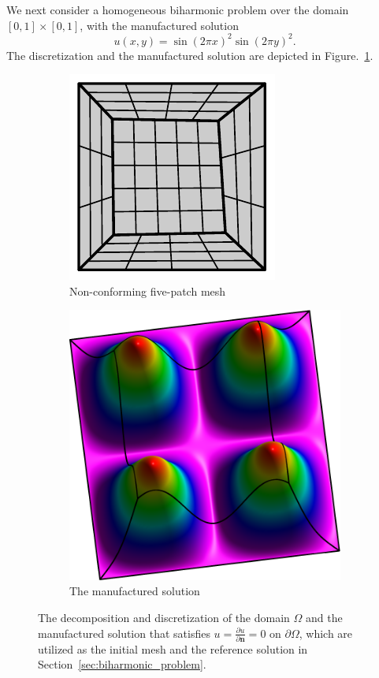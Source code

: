 We next consider a homogeneous biharmonic problem over the domain $\left[0, 1\right]\times \left[0, 1\right]$, with the manufactured solution
\begin{equation}
	u(x,y)=\sin(2\pi{x})^2\sin(2\pi{y})^2.
\end{equation}
The discretization and the manufactured solution are depicted in Figure.~\ref{fig:biharmonic_mesh}.
\begin{figure}[ht]
	\center
	\begin{subfigure}[t]{.45\linewidth}
		\center
		\includegraphics[scale=1.35]{five_patches_mesh}
		\caption{Non-conforming five-patch mesh}
	\end{subfigure}
	\begin{subfigure}[t]{.45\linewidth}
		\center
		\includegraphics[scale=.425]{five_patch_solution-plot}
		\caption{The manufactured solution}
	\end{subfigure}
	\caption{The decomposition and discretization of the domain $\Omega$ and the manufactured solution that satisfies $u=\frac{\partial u}{\partial \mathbf{n}}=0$ on $\partial\Omega$, which are utilized as the initial mesh and the reference solution in Section~\ref{sec:biharmonic_problem}.}\label{fig:biharmonic_mesh}
\end{figure}


